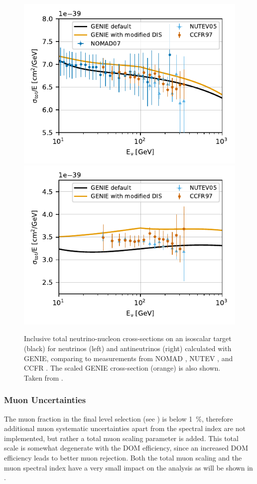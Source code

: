 \begin{figure}
    \centering 
    \includegraphics[width=0.49\linewidth]{figures/simulation_and_processing/cross_sections/NuMu_CC_iso_comp_to_data__upd_style.pdf}
    \includegraphics[width=0.49\linewidth]{figures/simulation_and_processing/cross_sections/NuMu_Bar_CC_iso_comp_to_data__upd_style.pdf}
    
    \caption[Inclusive total neutrino-nucleon cross-sections]{Inclusive total neutrino-nucleon cross-sections on an isoscalar target (black) for neutrinos (left) and antineutrinos (right) calculated with GENIE, comparing to measurements from NOMAD \cite{xsec_data_nomad}, NUTEV \cite{xsec_data_nutev}, and CCFR \cite{xsec_data_ccfr}. The scaled GENIE cross-section (orange) is also shown. Taken from \cite{OVS_PRD}.}
\end{figure}


\subsubsection{Muon Uncertainties}

The muon fraction in the final level selection (see ) is below \SI{1}{\percent}, therefore additional muon systematic uncertainties apart from the spectral index are not implemented, but rather a total muon scaling parameter is added. This total scale is somewhat degenerate with the DOM efficiency, since an increased DOM efficiency leads to better muon rejection. Both the total muon scaling and the muon spectral index have a very small impact on the analysis as will be shown in .


